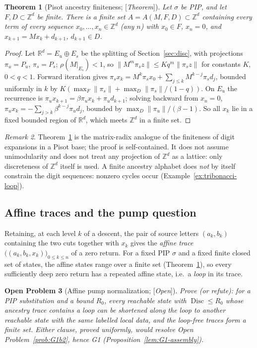 \documentclass[11pt]{amsart}
\theoremstyle{plain}
\newtheorem{theorem}{Theorem}[section]
\newtheorem{problem}[theorem]{Open Problem}
\theoremstyle{definition}
\theoremstyle{remark}
\newtheorem{remark}[theorem]{Remark}
\newcommand{\Z}{\mathbb{Z}}
\newcommand{\R}{\mathbb{R}}
\newcommand{\Disc}{\operatorname{Disc}}
\newcommand{\Status}[1]{\textup{[\textit{#1}]}}
\begin{document}
\begin{theorem}[Pisot ancestry finiteness; \Status{Theorem}]\label{thm:ancestry}
Let $\sigma$ be PIP, and let $F,D\subset\Z^d$ be finite. There is a finite set $A=A(M,F,D)\subset\Z^d$ containing every term of every sequence $x_0,\dots,x_n\in\Z^d$ (any $n$) with $x_0\in F$, $x_n=0$, and $x_{k+1}=Mx_k+d_{k+1}$, $d_{k+1}\in D$.
\end{theorem}
\begin{proof}
Let $\R^d=E_u\oplus E_s$ be the splitting of Section~\ref{sec:disc}, with projections $\pi_u=P_u$, $\pi_s=P_s$; $\rho(M|_{E_s})<1$, so $\|M^m\pi_sz\|\le K q^m\|\pi_sz\|$ for constants $K$, $0<q<1$. Forward iteration gives $\pi_sx_k=M^k\pi_sx_0+\sum_{j\le k}M^{k-j}\pi_sd_j$, bounded uniformly in $k$ by $K(\max_F\|\pi_s\|+\max_D\|\pi_s\|/(1-q))$. On $E_u$ the recurrence is $\pi_ux_{k+1}=\beta\pi_ux_k+\pi_ud_{k+1}$; solving backward from $x_n=0$, $\pi_ux_k=-\sum_{j>k}\beta^{k-j}\pi_ud_j$, bounded by $\max_D\|\pi_u\|/(\beta-1)$. So all $x_k$ lie in a fixed bounded region of $\R^d$, which meets $\Z^d$ in a finite set.
\end{proof}

\begin{remark}
Theorem~\ref{thm:ancestry} is the matrix-radix analogue of the finiteness of digit expansions in a Pisot base; the proof is self-contained. It does not assume unimodularity and does not treat any projection of $\Z^d$ as a lattice: only discreteness of $\Z^d$ itself is used. A finite ancestry alphabet does \emph{not} by itself constrain the digit sequences: nonzero cycles occur (Example~\ref{ex:tribonacci-loop}).
\end{remark}

\subsection{Affine traces and the pump question}\label{sec:pump}

Retaining, at each level $k$ of a descent, the pair of source letters $(a_k,b_k)$ containing the two cuts together with $x_k$ gives the \emph{affine trace} $\bigl((a_k,b_k,x_k)\bigr)_{0\le k\le n}$ of a zero return. For a fixed PIP $\sigma$ and a fixed finite closed set of states, the affine states range over a finite set (Theorem~\ref{thm:ancestry}), so every sufficiently deep zero return has a repeated affine state, i.e.\ a \emph{loop} in its trace.

\begin{problem}[Affine pump normalization; \Status{Open}]\label{prob:pump}
Prove (or refute): for a PIP substitution and a bound $R_0$, every reachable state with $\Disc\le R_0$ whose ancestry trace contains a loop can be shortened along the loop to another reachable state with the same labelled local data, and the loop-free traces form a finite set. Either clause, proved uniformly, would resolve Open Problem~\ref{prob:G1b2}, hence G1 (Proposition~\ref{lem:G1-assembly}).
\end{problem}
\end{document}
